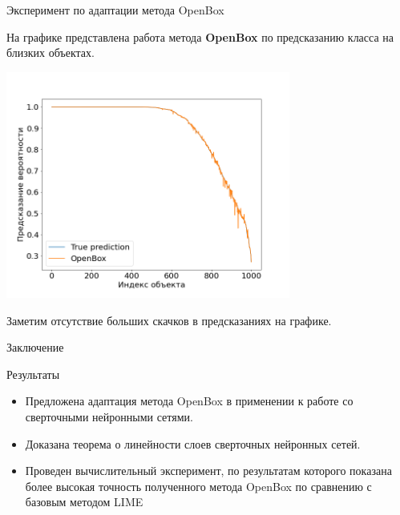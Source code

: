\documentclass{beamer}
\begin{document}
\begin{frame}{Эксперимент по адаптации метода OpenBox}

 На графике представлена работа метода \textbf{OpenBox} по предсказанию класса на близких объектах.
 
 \includegraphics[width=0.70\textwidth]{../fig/True_OpenBox.png}


Заметим отсутствие больших скачков в предсказаниях на графике.

\end{frame}
\begin{frame}{Заключение}
    \begin{block}{Результаты}
    \begin{itemize}
        \item Предложена адаптация метода OpenBox в применении к работе со сверточными нейронными сетями.
        \item Доказана теорема о линейности слоев сверточных нейронных сетей.
        \item Проведен вычислительный эксперимент, по результатам которого показана более высокая точность полученного метода OpenBox по сравнению с базовым методом LIME
    \end{itemize}
    \end{block}
\end{frame}
\end{document}
